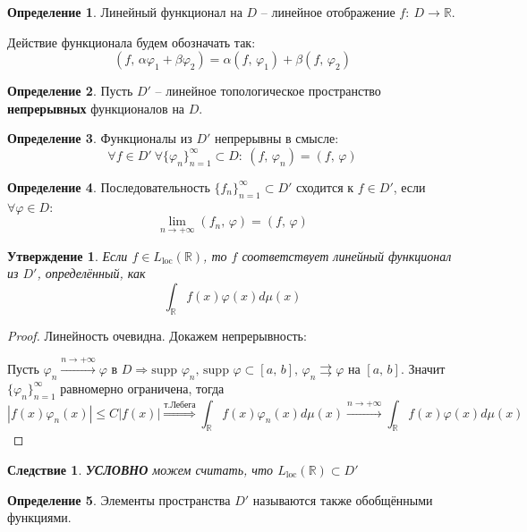 \documentclass[a4paper,12pt]{article}
\renewcommand{\phi}{\ensuremath{\varphi}}
\renewcommand{\leq}{\ensuremath{\leqslant}}
\theoremstyle{plain}
\newtheorem{proposition}{Утверждение}[section]
\newtheorem*{corollary}{Следствие}
\theoremstyle{definition}
\newtheorem{definition}{Определение}[section]
\theoremstyle{remark}
\begin{document}
\begin{definition}
	Линейный функционал на $D$ -- линейное отображение $f:\: D \to \mathbb{R}$.

	Действие функционала будем обозначать так:
	\[(f,\, \alpha\phi_1 + \beta\phi_2) = \alpha(f,\,\phi_1) + \beta(f,\,\phi_2)\]
\end{definition}

\begin{definition}
	Пусть $D'$ -- линейное топологическое пространство \textbf{непрерывных} функционалов на $D$.
\end{definition}

\begin{definition}
	Функционалы из $D'$ непрерывны в смысле:
	\[\forall f \in D' \: \forall \{\phi_n\}_{n = 1}^\infty \subset D:\: (f,\,\phi_n) = (f,\,\phi)\]
\end{definition}

\begin{definition}
	Последовательность $\{f_n\}_{n = 1}^\infty \subset D'$ сходится к $f \in D'$, если $\forall \phi \in D$:
	\[\lim_{n \to +\infty}(f_n,\,\phi) = (f,\,\phi)\]
\end{definition}

\begin{proposition}
	Если $f \in L_{\text{loc}}(\mathbb{R})$, то $f$ соответствует линейный функционал из $D'$, определённый, как
	\[\int_\mathbb{R}f(x)\phi(x)d\mu(x)\]
\end{proposition}

\begin{proof}
	Линейность очевидна. Докажем непрерывность:

	Пусть $\phi_n \stackrel{n \to +\infty}{\to} \phi$ в $D \Rightarrow \text{supp }\phi_n,\,\text{supp }\phi \subset [a,\,b],\, \phi_n \rightrightarrows \phi$ на $[a,\,b]$. Значит $\{\phi_n\}_{n = 1}^\infty$ равномерно ограничена, тогда
	\[|f(x)\phi_n(x)| \leq C|f(x)| \stackrel{\text{т.Лебега}}{\Rightarrow} \int_\mathbb{R}f(x)\phi_n(x)d\mu(x) \stackrel{n \to +\infty}{\to} \int_\mathbb{R}f(x)\phi(x)d\mu(x)\]
\end{proof}

\begin{corollary}
	\textbf{УСЛОВНО} можем считать, что $L_{\text{loc}}(\mathbb{R}) \subset D'$
\end{corollary}

\begin{definition}
	Элементы пространства $D'$ называются также обобщёнными функциями.
\end{definition}
\end{document}
